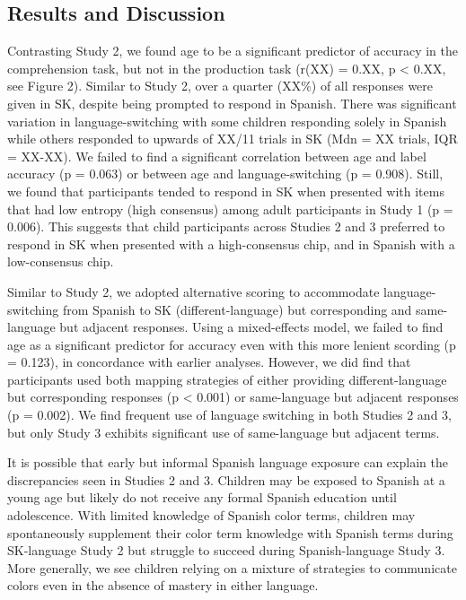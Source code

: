 \documentclass[
  english,
  ,man,floatsintext]{apa6}
\begin{document}
\hypertarget{results-and-discussion-2}{%
\subsection{Results and Discussion}\label{results-and-discussion-2}}

Contrasting Study 2, we found age to be a significant predictor of accuracy in the comprehension task, but not in the production task (r(XX) = 0.XX, p \textless{} 0.XX, see Figure 2). Similar to Study 2, over a quarter (XX\%) of all responses were given in SK, despite being prompted to respond in Spanish. There was significant variation in language-switching with some children responding solely in Spanish while others responded to upwards of XX/11 trials in SK (Mdn = XX trials, IQR = XX-XX). We failed to find a significant correlation between age and label accuracy (p = 0.063) or between age and language-switching (p = 0.908). Still, we found that participants tended to respond in SK when presented with items that had low entropy (high consensus) among adult participants in Study 1 (p = 0.006). This suggests that child participants across Studies 2 and 3 preferred to respond in SK when presented with a high-consensus chip, and in Spanish with a low-consensus chip.

Similar to Study 2, we adopted alternative scoring to accommodate language-switching from Spanish to SK (different-language) but corresponding and same-language but adjacent responses. Using a mixed-effects model, we failed to find age as a significant predictor for accuracy even with this more lenient scording (p = 0.123), in concordance with earlier analyses. However, we did find that participants used both mapping strategies of either providing different-language but corresponding responses (p \textless{} 0.001) or same-language but adjacent responses (p = 0.002). We find frequent use of language switching in both Studies 2 and 3, but only Study 3 exhibits significant use of same-language but adjacent terms.

It is possible that early but informal Spanish language exposure can explain the discrepancies seen in Studies 2 and 3. Children may be exposed to Spanish at a young age but likely do not receive any formal Spanish education until adolescence. With limited knowledge of Spanish color terms, children may spontaneously supplement their color term knowledge with Spanish terms during SK-language Study 2 but struggle to succeed during Spanish-language Study 3. More generally, we see children relying on a mixture of strategies to communicate colors even in the absence of mastery in either language.
\end{document}
